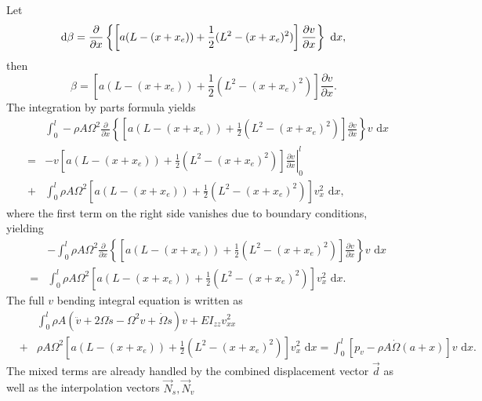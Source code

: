 Let
\begin{equation}
\text d\beta = \frac{\partial}{\partial x}\left\lbrace \left[a(L-(x+x_e))+\frac{1}{2}(L^2-(x+x_e)^2)\right]\frac{\partial v}{\partial x}\right\rbrace\text{ d}x,
\end{equation}
then
\begin{equation}
\beta = \left[a(L-(x+x_e))+\frac{1}{2}(L^2-(x+x_e)^2)\right]\frac{\partial v}{\partial x}.
\end{equation}
The integration by parts formula yields
\begin{eqnarray}
\label{eq:v.disc.int.by.parts.2}
& &\int_0^l-\rho A\Omega^2\frac{\partial}{\partial x}\left\lbrace \left[a(L-(x+x_e))+\frac{1}{2}(L^2-(x+x_e)^2)\right]\frac{\partial v}{\partial x}\right\rbrace v\text{ d}x\nonumber\\
&=&-\left.v\left[a(L-(x+x_e))+\frac{1}{2}(L^2-(x+x_e)^2)\right]\frac{\partial v}{\partial x}\right|_0^l\\
&+&\int_0^l \rho A\Omega^2\left[a(L-(x+x_e))+\frac{1}{2}(L^2-(x+x_e)^2)\right]v_x^2\text{ d}x, \nonumber
\end{eqnarray}
where the first term on the right side vanishes due to boundary conditions, yielding
\begin{eqnarray}
& &-\int_0^l\rho A\Omega^2\frac{\partial}{\partial x}\left\lbrace \left[a(L-(x+x_e))+\frac{1}{2}(L^2-(x+x_e)^2)\right]\frac{\partial v}{\partial x}\right\rbrace v\text{ d}x\\
&=& \int_0^l \rho A\Omega^2\left[a(L-(x+x_e))+\frac{1}{2}(L^2-(x+x_e)^2)\right]v_x^2\text{ d}x. \nonumber
\end{eqnarray}
The full $v$ bending integral equation is written as
\begin{eqnarray}
\label{eq:v_bending_integral_eqn}
& &\int_0^l\rho A(\ddot v + 2\Omega\dot s-\Omega^2v+\dot\Omega s)v+EI_{zz}v_{xx}^2\\
&+&\rho A\Omega^2\left[a(L-(x+x_e))+\frac{1}{2}(L^2-(x+x_e)^2)\right]v_x^2\text{ d}x = \int_0^l[p_v - \rho A\dot\Omega(a+x)]v\text{ d}x. \nonumber
\end{eqnarray}
The mixed terms are already handled by the combined displacement vector $\vec d$ as well as the interpolation vectors $\vec N_s,\vec N_v$

\begin{comment}
The full $v$ bending integral equation is written as
\begin{eqnarray}
\label{eq:v_bending_integral_eqn}
\int_0^l\rho A(\ddot v + 2\Omega\dot s-\Omega^2v+\dot\Omega s)v+EI_{zz}v_{xx}^2+\\
\rho A\Omega^2\left[a(L-(x+x_e))+\frac{1}{2}(L^2-(x+x_e)^2)\right]v_x^2\text{ d}x = \int_0^l[p_v - \rho A\dot\Omega(a+x)]v\text{ d}x. \nonumber
\end{eqnarray}
The mixed terms are already handled by the combined displacement vector $\vec d$ as well as the interpolation vectors $\vec N_s,\vec N_v$.
\end{comment}


